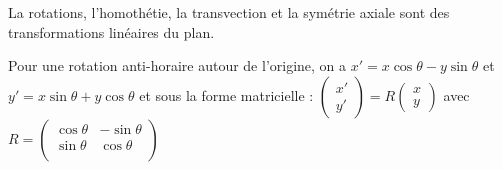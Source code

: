 \documentclass{book}
\begin{document}
\begin{Exemple}
La rotations, l'homothétie, la transvection et la   symétrie axiale sont des transformations linéaires du plan. 
\begin{center}
\begin{Figure}

\begin{Titre}
Pour une rotation anti-horaire autour de l'origine, on a  $x '= x \cos \theta -y \sin \theta$ et $y ' = x \sin \theta + y \cos \theta$ et sous la forme matricielle : $\begin{pmatrix} x '\\ y' \end{pmatrix} = R \begin{pmatrix} x \\ y \end{pmatrix}$ avec $R=\begin{pmatrix}
\cos \theta & -\sin \theta\\
\sin \theta & \cos \theta\\
\end{pmatrix}$
\end{Titre}
\end{Figure}
\end{center}
\end{Exemple}
\end{document}
